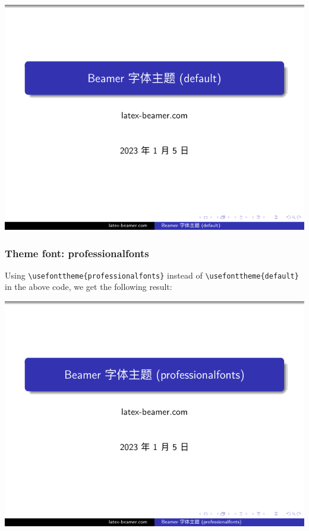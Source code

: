 \includegraphics[page=2]{examples/beamer/beamerfont05.pdf}

\subsubsection{Theme font: {\ttfamily professionalfonts}}

Using \verb|\usefonttheme{professionalfonts}| instead of \verb|\usefonttheme{default}| in the above code, we get the following result:

\includegraphics[page=1]{examples/beamer/beamerfont06.pdf}

